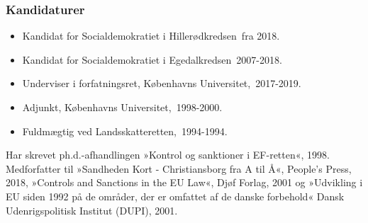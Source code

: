 \documentclass[11pt, a4paper]{awesome-cv}
\begin{document}
\begin{cvletter}
\subsubsection*{Kandidaturer}
\begin{itemize}
\item Kandidat for Socialdemokratiet i Hillerødkredsen fra 2018.
\item Kandidat for Socialdemokratiet i Egedalkredsen 2007-2018.
\end{itemize}
\begin{itemize}
\item Underviser i forfatningsret, Københavns Universitet, 2017-2019.
\item Adjunkt, Københavns Universitet, 1998-2000.
\item Fuldmægtig ved Landsskatteretten, 1994-1994.
\end{itemize}
Har skrevet ph.d.-afhandlingen »Kontrol og sanktioner i EF-retten«, 1998. Medforfatter til »Sandheden Kort - Christiansborg fra A til Å«, People's Press, 2018, »Controls and Sanctions in the EU Law«, Djøf Forlag, 2001 og »Udvikling i EU siden 1992 på de områder, der er omfattet af de danske forbehold« Dansk Udenrigspolitisk Institut (DUPI), 2001.

\end{cvletter}
\end{document}
